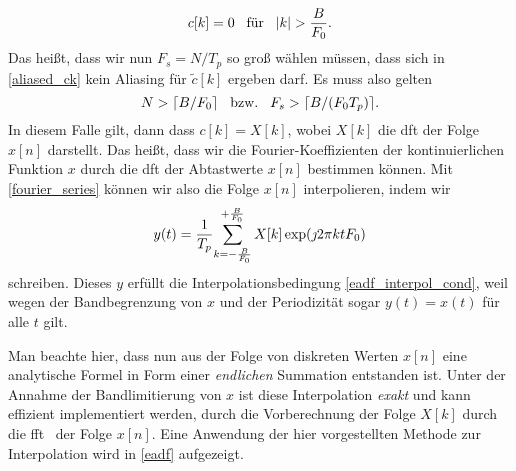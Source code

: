 \begin{equation}
    c[k] = 0 {\hspace{3mm} \text{f\"ur} \hspace{3mm}} {\left| k \right|} > \frac{B}{F_0}.
\end{equation}
Das hei{\ss}t, dass wir nun $F_s = N/T_p$ so gro{\ss} w\"ahlen m\"ussen, dass sich in \eqref{aliased_ck} kein Aliasing f\"ur $\tilde{c}[k]$ ergeben darf. Es muss also gelten
\begin{equation}
    N > \lceil B/F_0 \rceil {\hspace{3mm} \text{bzw.} \hspace{3mm}} F_s > \lceil B/(F_0 T_p) \rceil.
\end{equation}
In diesem Falle gilt, dann dass $c[k] = X[k]$, wobei $X[k]$ die \gls{dft} der Folge $x[n]$ darstellt. Das hei{\ss}t, dass wir die Fourier-Koeffizienten der kontinuierlichen Funktion $x$ durch die \gls{dft} der Abtastwerte $x[n]$ bestimmen k\"onnen. Mit \eqref{fourier_series} k\"onnen wir also die Folge $x[n]$ interpolieren, indem wir
\begin{equation}\label{dft_interpolation}
    y(t) = \frac{1}{T_p}{\sum\limits_{k=-\frac{B}{F_0}}^{+\frac{B}{F_0}}{
        X[k] \exp(\jmath 2 \pi k t F_0) 
    }}
\end{equation}
schreiben. Dieses $y$ erf\"ullt die Interpolationsbedingung \eqref{eadf_interpol_cond}, weil wegen der Bandbegrenzung von $x$ und der Periodizit\"at sogar $y(t) = x(t)$ f\"ur alle $t$ gilt.

Man beachte hier, dass nun aus der Folge von diskreten Werten $x[n]$ eine analytische Formel in Form einer \emph{endlichen} Summation entstanden ist. Unter der Annahme der Bandlimitierung von $x$ ist diese Interpolation \emph{exakt} und kann effizient implementiert werden, durch die Vorberechnung der Folge $X[k]$ durch die \gls{fft}~\cite{FFTW05} der Folge $x[n]$. Eine Anwendung der hier vorgestellten Methode zur Interpolation wird in \cref{eadf} aufgezeigt.